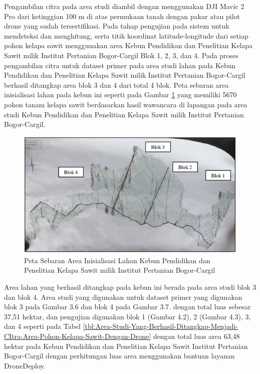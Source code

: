 Pengambilan citra pada area studi diambil dengan menggunakan DJI Mavic 2 Pro dari ketinggian 100 m di atas permukaan tanah dengan pakar atau pilot drone yang sudah tersertifikasi. Pada tahap pengujian pada sistem untuk mendeteksi dan menghitung, serta titik koordinat latitude-longitude dari setiap pohon kelapa sawit menggunakan area Kebun Pendidikan dan Penelitian Kelapa Sawit milik Institut Pertanian Bogor-Cargil Blok 1, 2, 3, dan 4. Pada proses pengambilan citra untuk dataset primer pada area studi lahan pada Kebun Pendidikan dan Penelitian Kelapa Sawit milik Institut Pertanian Bogor-Cargil berhasil ditangkap area blok 3 dan 4 dari total 4 blok. Peta sebaran area inisialisasi lahan pada kebun ini seperti pada Gambar \ref{img:Peta-Sebaran-Area-Inisialisasi-Lahan-Kebun} yang memiliki 5670 pohon tanam kelapa sawit berdasarkan hasil wawancara di lapangan pada area studi Kebun Pendidikan dan Penelitian Kelapa Sawit milik Institut Pertanian Bogor-Cargil.

\begin{figure}[H]
	\vspace{-0.1cm}
	\begin{center}
		\includegraphics[width=1\columnwidth]{bab4/Gambar/Picture1.png}
	\end{center}
	\vspace{-0.2cm}
	\captionsetup{justification=centering}
	\caption{Peta Sebaran Area Inisialisasi Lahan Kebun Pendidikan dan Penelitian Kelapa Sawit milik Institut Pertanian Bogor-Cargil}\label{img:Peta-Sebaran-Area-Inisialisasi-Lahan-Kebun}
\end{figure}

Area lahan yang berhasil ditangkap pada kebun ini berada pada area studi blok 3 dan blok 4. Area studi yang digunakan untuk dataset primer yang digunakan blok 3 pada Gambar 3.6 dan blok 4 pada Gambar 3.7. dengan total luas sebesar 37,51 hektar, dan pengujian digunakan blok 1 (Gambar 4.2), 2 (Gambar 4.3), 3, dan 4 seperti pada Tabel \ref{tbl:Area-Studi-Yang-Berhasil-Ditangkap-Menjadi-CItra-Area-Pohon-Kelapa-Sawit-Dengan-Drone} dengan total luas area 63,48 hektar pada Kebun Pendidikan dan Penelitian Kelapa Sawit Institut Pertanian Bogor-Cargil dengan perhitungan luas area menggunakan bantuan layanan DroneDeploy.

